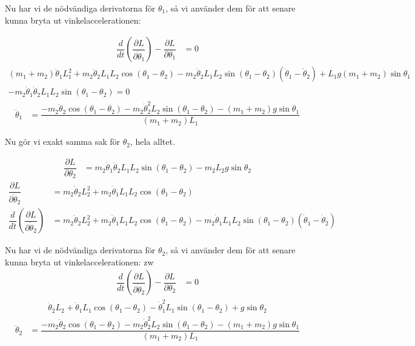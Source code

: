 \documentclass[10pt, a4paper]{amsart}
\begin{document}
Nu har vi de nödvändiga derivatorna för $ \theta_1 $, så vi använder dem för att senare kunna bryta ut vinkelaccelerationen: \bigskip 


\begin{align}
    \dfrac{d}{dt} (\dfrac{\partial L}{\partial\dot\theta_1}) - \dfrac{\partial L}{\partial\theta_1} &= 0
\end{align}
\begin{multline}
    (m_1 + m_2)\ddot\theta_1L_1^2 + m_2\ddot\theta_2L_1L_2\cos(\theta_1 - \theta_2) - m_2\dot\theta_2L_1L_2\sin(\theta_1 - \theta_2)(\dot\theta_1 - \dot\theta_2) + L_1g(m_1+m_2)\sin\theta_1 \\ - m_2\dot\theta_1\dot\theta_2L_1L_2\sin(\theta_1 - \theta_2) = 0
\end{multline}
\begin{align}
    \ddot\theta_1 &= \dfrac{-m_2\ddot\theta_2\cos(\theta_1 - \theta_2) - m_2\dot\theta_2^2L_2\sin(\theta_1 - \theta_2) - (m_1 + m_2)g\sin\theta_1}{(m_1 + m_2)L_1}
\end{align} \bigskip 

Nu gör vi exakt samma sak för $ \theta_2 $, hela alltet.

\begin{align}
    \dfrac{\partial L}{\partial\theta_2} &= m_2\dot\theta_1\dot\theta_2L_1L_2\sin(\theta_1 - \theta_2) - m_2L_2g\sin\theta_2
\end{align}
\begin{align}
    \dfrac{\partial L}{\partial\dot\theta_2} &= m_2\dot\theta_2L_2^2 + m_2\dot\theta_1L_1L_2\cos(\theta_1 - \theta_2) \\
    \dfrac{d}{dt} (\dfrac{\partial L}{\partial\dot\theta_2}) &= m_2\ddot\theta_2L_2^2 + m_2\ddot\theta_1L_1L_2\cos(\theta_1 - \theta_2) - m_2\dot\theta_1L_1L_2\sin(\theta_1 - \theta_2)(\dot\theta_1 - \dot\theta_2)
\end{align} \bigskip 

Nu har vi de nödvändiga derivatorna för $ \theta_2 $, så vi använder dem för att senare kunna bryta ut vinkelaccelerationen: \bigskip 
zw
\begin{align}
    \dfrac{d}{dt} (\dfrac{\partial L}{\partial\dot\theta_2}) - \dfrac{\partial L}{\partial\theta_2} &= 0
\end{align}
\begin{align}
    \ddot\theta_2L_2 + \ddot\theta_1L_1\cos(\theta_1 - \theta_2) - \dot\theta_1^2L_1\sin(\theta_1 - \theta_2) + g\sin\theta_2
\end{align}
\begin{align}
    \ddot\theta_2 &= \dfrac{-m_2\ddot\theta_2\cos(\theta_1 - \theta_2) - m_2\dot\theta_2^2L_2\sin(\theta_1 - \theta_2) - (m_1 + m_2)g\sin\theta_1}{(m_1 + m_2)L_1}
\end{align} \bigskip
\end{document}
